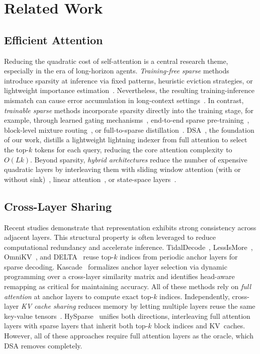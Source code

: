 \section{Related Work}
\label{sec:related}

\subsection{Efficient Attention}
\label{sec:related-efficient}

Reducing the quadratic cost of self-attention is a central research theme, especially in the era of long-horizon agents.
\emph{Training-free sparse} methods introduce sparsity at inference via fixed patterns, heuristic eviction strategies, or lightweight importance estimation~\citep{h2o,streamingllm,sparq,quest,minference,duoattention,xattention,flexprefill,moa,sampleattention,lserve,spargeattention}.
Nevertheless, the resulting training-inference mismatch can cause error accumulation in long-context settings~\citep{lil}.
In contrast, \emph{trainable sparse} methods incorporate sparsity directly into the training stage, for example, through learned gating mechanisms~\citep{seerattention,seerattentionr}, end-to-end sparse pre-training~\citep{nsa}, block-level mixture routing~\citep{moba,infllm-v2,minicpm4}, or full-to-sparse distillation~\citep{deepseekv32,ssa}.
DSA~\citep{deepseekv32}, the foundation of our work, distills a lightweight lightning indexer from full attention to select the top-$k$ tokens for each query, reducing the core attention complexity to~$O(Lk)$.
Beyond sparsity, \emph{hybrid architectures} reduce the number of expensive quadratic layers by interleaving them with sliding window attention (with or without sink)~\citep{gptoss,gemma3,mimov2,longcat}, linear attention~\citep{gdn,minimax01,nemotron-h,kimilinear}, or state-space layers~\citep{mamba,mamba2,jamba}.

\subsection{Cross-Layer Sharing}
\label{sec:related-crosslayer}
Recent studies demonstrate that representation exhibits strong consistency across adjacent layers.
This structural property is often leveraged to reduce computational redundancy and accelerate inference.
TidalDecode~\citep{tidaldecode}, LessIsMore~\citep{lessismore}, OmniKV~\citep{omnikv}, and DELTA~\citep{delta} reuse top-$k$ indices from periodic anchor layers for sparse decoding.
Kascade~\citep{kascade} formalizes anchor layer selection via dynamic programming over a cross-layer similarity matrix and identifies head-aware remapping as critical for maintaining accuracy.
All of these methods rely on \emph{full attention} at anchor layers to compute exact top-$k$ indices.
Independently, cross-layer \emph{KV cache sharing} reduces memory by letting multiple layers reuse the same key-value tensors~\citep{yoco,cla,minicache,swiftkv,mlkv,wu2025improving}.
HySparse~\citep{hysparse} unifies both directions, interleaving full attention layers with sparse layers that inherit both top-$k$ block indices and KV~caches.
However, all of these approaches require full attention layers as the oracle, which DSA removes completely.


